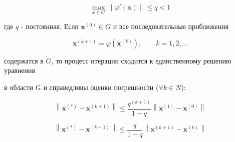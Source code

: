 $$\max_{x \in G} \left\|\varphi'(\textbf{x}) \right\| \leqslant q < 1$$

где $q$ - постоянная. Если $\textbf{x}^{(0)} \in G$
и все последовательные приближения

$$\textbf{x}^{(k+1)}=\varphi(\textbf{x}^{(k)}), \qquad k = 1,2,\dots$$

содержатся в $G$,
то процесс итерации сходится к единственному решению уравнения

в области G и справедливы оценки погрешности ($\forall k \in N$):

$$\left\| \textbf{x}^{(*)} - \textbf{x}^{(k+1)}\right\|
\leqslant
\frac{q^{(k+1)}}{1 - q}\left\| \textbf{x}^{(1)} - \textbf{x}^{(0)}\right\|$$

$$\left\| \textbf{x}^{(*)} - \textbf{x}^{(k+1)}\right\|
\leqslant
\frac{q}{1 - q}\left\| \textbf{x}^{(k+1)} - \textbf{x}^{(k)}\right\|$$
\pagebreak